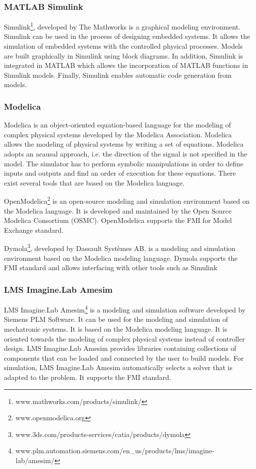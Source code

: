 
\subsubsection{MATLAB Simulink}
Simulink\footnote{www.mathworks.com/products/simulink/}, developed by The Mathworks is a graphical modeling environment. Simulink can be used in the  process of designing embedded systems. It allows the simulation of embedded systems with the controlled physical processes. Models are built graphically in Simulink using block diagrams. In addition, Simulink is integrated in MATLAB which allows the incorporation of MATLAB functions in Simulink models. Finally, Simulink enables automatic code generation from models.

\subsubsection{Modelica}
Modelica is an object-oriented equation-based language for the modeling of complex physical systems developed by the Modelica Association. Modelica allows the modeling of physical systems by writing a set of equations. Modelica adopts an acausal approach, i.e. the direction of the signal is not specified in the model. The simulator has to perform symbolic manipulations in order to define inputs and outputs and find an order of execution for these equations. There exist several tools that are based on the Modelica language.

OpenModelica\footnote{www.openmodelica.org} is an open-source modeling and simulation environment based on the Modelica language. It is developed and maintained by the Open Source Modelica Consortium (OSMC). OpenModelica supports the FMI for Model Exchange standard.

Dymola\footnote{www.3ds.com/products-services/catia/products/dymola}, developed by Dassault Syst\`emes AB, is a modeling and simulation environment based on the Modelica modeling language. Dymola supports the FMI standard and allows interfacing with other tools such as Simulink

\subsubsection{LMS Imagine.Lab Amesim}
LMS Imagine.Lab Amesim\footnote{www.plm.automation.siemens.com/en\_us/products/lms/imagine-lab/amesim/} is a modeling and simulation software developed by Siemens PLM Software. It can be used for the modeling and simulation of mechatronic systems. It is based on the Modelica modeling language. It is oriented towards the modeling of complex physical systems instead of controller design. LMS Imagine.Lab Amesim provides libraries containing collections of components that can be loaded and connected by the user to build models. For simulation, LMS Imagine.Lab Amesim automatically selects a solver that is adapted to the problem. It supports the FMI standard.

